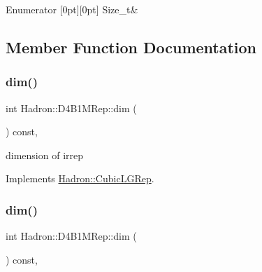 \begin{DoxyEnumFields}{Enumerator}
[0pt][0pt]{}\mbox{\label{structHadron_1_1D4B1MRep_a68ecc9fb2227e34c12d6ff6d46e06557acd3afdc9da25e652764e19d3f96dfb4e}} 
Size\+\_\+t&\\
\hline

\end{DoxyEnumFields}


\subsection{Member Function Documentation}
\mbox{\label{structHadron_1_1D4B1MRep_a157803c0c4f71990cbc71bd4f37f3254}} 
\subsubsection{\texorpdfstring{dim()}{dim()}\hspace{0.1cm}{\footnotesize\ttfamily [1/3]}}
{\footnotesize\ttfamily int Hadron\+::\+D4\+B1\+M\+Rep\+::dim (\begin{DoxyParamCaption}{ }\end{DoxyParamCaption}) const\hspace{0.3cm}{\ttfamily [inline]}, {\ttfamily [virtual]}}

dimension of irrep 

Implements \mbox{\hyperlink{structHadron_1_1CubicLGRep_a3acbaea26503ed64f20df693a48e4cdd}{Hadron\+::\+Cubic\+L\+G\+Rep}}.

\mbox{\label{structHadron_1_1D4B1MRep_a157803c0c4f71990cbc71bd4f37f3254}} 
\subsubsection{\texorpdfstring{dim()}{dim()}\hspace{0.1cm}{\footnotesize\ttfamily [2/3]}}
{\footnotesize\ttfamily int Hadron\+::\+D4\+B1\+M\+Rep\+::dim (\begin{DoxyParamCaption}{ }\end{DoxyParamCaption}) const\hspace{0.3cm}{\ttfamily [inline]}, {\ttfamily [virtual]}}

